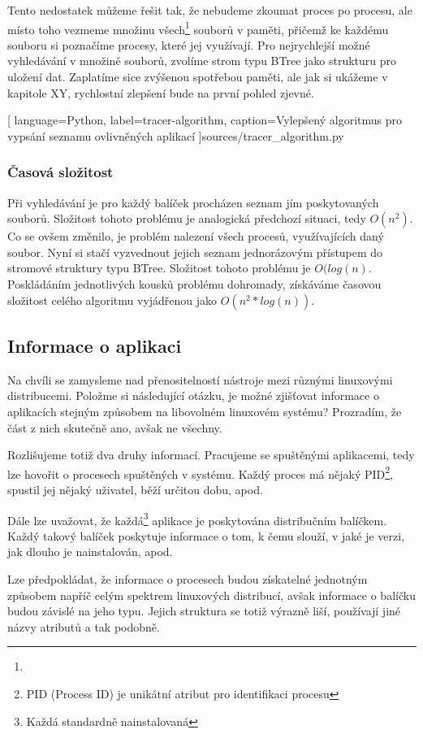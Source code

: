 \documentclass[
  field=inf,
  biblatex,
  glossaries,
  index
]{kidiplom}
\begin{document}
	Tento nedostatek můžeme řešit tak, že nebudeme zkoumat proces po procesu, ale místo toho vezmeme množinu všech\footnote{} souborů v paměti, přičemž ke každému souboru si poznačíme procesy, které jej využívají. Pro nejrychlejší možné vyhledávání v množině souborů, zvolíme strom typu BTree jako strukturu pro uložení dat. Zaplatíme sice zvýšenou spotřebou paměti, ale jak si ukážeme v kapitole XY, rychlostní zlepšení bude na první pohled zjevné.

	
	[
		language={Python},
		label=tracer-algorithm,
		caption={Vylepšený algoritmus pro vypsání seznamu ovlivněných aplikací}
	]{sources/tracer_algorithm.py}

		\subsubsection*{Časová složitost}
		Při vyhledávání je pro každý balíček procházen seznam jím poskytovaných souborů. Složitost tohoto problému je analogická předchozí situaci, tedy $O(n^2)$. Co se ovšem změnilo, je problém nalezení všech procesů, využívajících daný soubor. Nyní si stačí vyzvednout jejich seznam jednorázovým přístupem do stromové struktury typu BTree. Složitost tohoto problému je $O(log(n)$. Poskládáním jednotlivých kousků problému dohromady, získáváme časovou složitost celého algoritmu vyjádřenou jako $O(n^2 * log(n))$.

	\subsection{Informace o aplikaci}
	Na chvíli se zamysleme nad přenositelností nástroje mezi různými linuxovými distribucemi. Položme si následující otázku, je možné zjišťovat informace o aplikacích stejným způsobem na libovolném linuxovém systému? Prozradím, že část z nich skutečně ano, avšak ne všechny.

	Rozlišujeme totiž dva druhy informací. Pracujeme se spuštěnými aplikacemi, tedy lze hovořit o procesech spuštěných v systému. Každý proces má nějaký PID\footnote{PID (Process ID) je unikátní atribut pro identifikaci procesu}, spustil jej nějaký uživatel, běží určitou dobu, apod.

	Dále lze uvažovat, že každá\footnote{Každá standardně nainstalovaná} aplikace je poskytována distribučním balíčkem. Každý takový balíček poskytuje informace o tom, k čemu slouží, v jaké je verzi, jak dlouho je nainstalován, apod.

	Lze předpokládat, že informace o procesech budou získatelné jednotným způsobem napříč celým spektrem linuxových distribucí, avšak informace o balíčku budou závislé na jeho typu. Jejich struktura se totiž výrazně liší, používají jiné názvy atributů a tak podobně.
\end{document}
